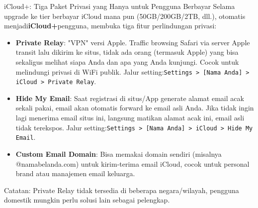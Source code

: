 \begin{tcbinfo}{iCloud+: Tiga Paket Privasi yang Hanya untuk Pengguna Berbayar}
Selama upgrade ke tier berbayar iCloud mana pun (50GB/200GB/2TB, dll.), otomatis menjadi\textbf{iCloud+}pengguna, membuka tiga fitur perlindungan privasi:

\begin{itemize}
  \item \textbf{Private Relay}: "VPN" versi Apple. Traffic browsing Safari via server Apple transit lalu dikirim ke situs, tidak ada orang (termasuk Apple) yang bisa sekaligus melihat siapa Anda dan apa yang Anda kunjungi. Cocok untuk melindungi privasi di WiFi publik. Jalur setting:\texttt{Settings > [Nama Anda] > iCloud > Private Relay}.
  \item \textbf{Hide My Email}: Saat registrasi di situs/App generate alamat email acak sekali pakai, email akan otomatis forward ke email asli Anda. Jika tidak ingin lagi menerima email situs ini, langsung matikan alamat acak ini, email asli tidak terekspos. Jalur setting:\texttt{Settings > [Nama Anda] > iCloud > Hide My Email}.
  \item \textbf{Custom Email Domain}: Bisa memakai domain sendiri (misalnya @namabelanda.com) untuk kirim-terima email iCloud, cocok untuk personal brand atau manajemen email keluarga.
\end{itemize}

Catatan: Private Relay tidak tersedia di beberapa negara/wilayah, pengguna domestik mungkin perlu solusi lain sebagai pelengkap.

\end{tcbinfo}

